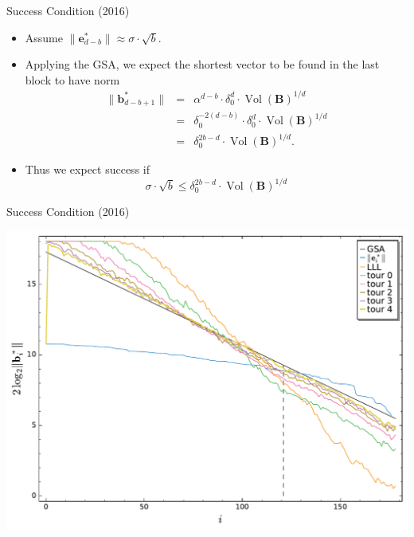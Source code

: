 \documentclass[presentation,smaller]{beamer}
\renewcommand{\vec}[1]{\mathbf{#1}\xspace}
\newcommand{\mat}[1]{\mathbf{#1}\xspace}
\DeclareMathOperator{\Vol}{Vol}
\begin{document}
\begin{frame}[label={sec:org9b3d7b6}]{Success Condition (2016)}
\begin{itemize}
\item Assume \(\|\vec{e}^*_{d-b}\| ≈ σ ⋅ \sqrt{b}\).
\item Applying the GSA, we expect the shortest vector to be found in the last block to have norm
\begin{eqnarray*}
 \|\vec{b}_{d-b+1}^*\| &=&  α^{d-b} ⋅ δ_0^d ⋅ {\Vol(\mat{B})}^{1/d}\\
                       &=& δ_0^{-2(d-b)} ⋅ δ_0^d ⋅ {\Vol(\mat{B})}^{1/d}\\
                       &=& δ_0^{2b-d} ⋅ {\Vol(\mat{B})}^{1/d}.
\end{eqnarray*}
\item Thus  we expect success if \[σ ⋅ \sqrt{b} ≤ δ_0^{2b-d} ⋅ {\Vol(\mat{B})}^{1/d}\]
\end{itemize}
\end{frame}

\begin{frame}[label={sec:org46eb8e8}]{Success Condition (2016)}
\begin{center}
\includegraphics[width=.9\linewidth]{./usvp-2016-visualisation.pdf}
\end{center}
\end{frame}
\end{document}
